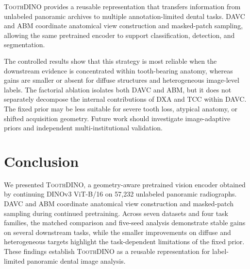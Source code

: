 \documentclass[conference]{IEEEtran}
\newcommand{\ToothDINO}{\textsc{ToothDINO}}
\newcommand{\DAVC}{\textsc{DAVC}}
\newcommand{\DXA}{\textsc{DXA}}
\newcommand{\TCC}{\textsc{TCC}}
\newcommand{\ABM}{\textsc{ABM}}
\begin{document}
\ToothDINO{} provides a reusable representation that transfers
information from unlabeled panoramic archives to multiple
annotation-limited dental tasks. \DAVC{} and \ABM{} coordinate
anatomical view construction and masked-patch sampling, allowing the
same pretrained encoder to support classification, detection, and
segmentation.

The controlled results show that this strategy is most reliable when
the downstream evidence is concentrated within tooth-bearing anatomy,
whereas gains are smaller or absent for diffuse structures and
heterogeneous image-level labels. The factorial ablation isolates both
\DAVC{} and \ABM{}, but it does not separately decompose the internal
contributions of \DXA{} and \TCC{} within \DAVC{}. The fixed prior may
be less suitable for severe tooth loss, atypical anatomy, or shifted
acquisition geometry. Future work should investigate image-adaptive
priors and independent multi-institutional validation.

\section{Conclusion}
\label{sec:conclusion}

We presented \ToothDINO{}, a geometry-aware pretrained vision encoder obtained by continuing DINOv3 ViT-B/16 on 57,232 unlabeled panoramic radiographs. \DAVC{} and \ABM{} coordinate anatomical view construction and masked-patch sampling during continued pretraining. Across seven datasets and four task families, the matched comparison and five-seed analysis demonstrate stable gains on several downstream tasks, while the smaller improvements on diffuse and heterogeneous targets highlight the task-dependent limitations of the fixed prior. These findings establish \ToothDINO{} as a reusable representation for label-limited panoramic dental image analysis.




\end{document}
